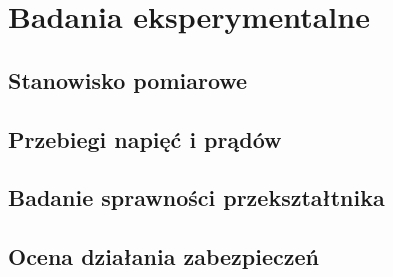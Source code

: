 \chapter{Badania eksperymentalne}
\label{chap: Badania eksperymentalne}

\section{Stanowisko pomiarowe}
\label{sec: Stanowisko pomiarowe}

\section{Przebiegi napięć i prądów}
\label{sec: Przebiegi napięć i prądów}

\section{Badanie sprawności przekształtnika}
\label{sec: Badanie sprawności przekształtnika}

\section{Ocena działania zabezpieczeń}
\label{sec: Ocena działania zabezpieczeń}